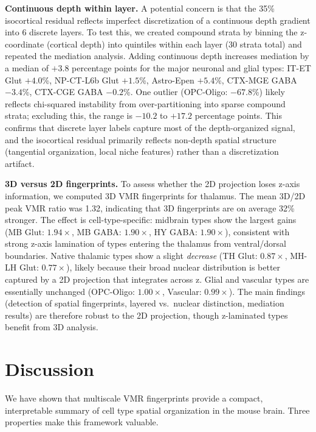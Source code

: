 \documentclass[11pt,a4paper]{article}
\begin{document}
\textbf{Continuous depth within layer.} A potential concern is that the 35\%
isocortical residual reflects imperfect discretization of a continuous
depth gradient into 6 discrete layers. To test this, we created compound strata
by binning the z-coordinate (cortical depth) into quintiles within each layer
(30 strata total) and repeated the mediation analysis. Adding continuous depth
increases mediation by a median of $+3.8$ percentage points for the major
neuronal and glial types: IT-ET Glut $+4.0$\%, NP-CT-L6b Glut $+1.5$\%,
Astro-Epen $+5.4$\%, CTX-MGE GABA $-3.4$\%, CTX-CGE GABA $-0.2$\%.
One outlier (OPC-Oligo: $-67.8$\%) likely reflects chi-squared instability
from over-partitioning into sparse compound strata; excluding this, the
range is $-10.2$ to $+17.2$ percentage points. This confirms that discrete
layer labels capture most of the depth-organized signal, and the isocortical
residual primarily reflects non-depth spatial structure (tangential
organization, local niche features) rather than a discretization artifact.

\textbf{3D versus 2D fingerprints.} To assess whether the 2D projection loses
z-axis information, we computed 3D VMR fingerprints for thalamus. The mean
3D/2D peak VMR ratio was 1.32, indicating that 3D fingerprints are on average
32\% stronger. The effect is cell-type-specific: midbrain types show the largest
gains (MB Glut: $1.94\times$, MB GABA: $1.90\times$, HY GABA: $1.90\times$),
consistent with strong z-axis lamination of types entering the thalamus from
ventral/dorsal boundaries. Native thalamic types show a slight \textit{decrease}
(TH Glut: $0.87\times$, MH-LH Glut: $0.77\times$), likely because their
broad nuclear distribution is better captured by a 2D projection that integrates
across z. Glial and vascular types are essentially unchanged
(OPC-Oligo: $1.00\times$, Vascular: $0.99\times$). The main findings
(detection of spatial fingerprints, layered vs.\ nuclear distinction, mediation
results) are therefore robust to the 2D projection, though z-laminated types
benefit from 3D analysis.


\section{Discussion}
\label{sec:discussion}

We have shown that multiscale VMR fingerprints provide a compact, interpretable
summary of cell type spatial organization in the mouse brain. Three properties
make this framework valuable.
\end{document}
